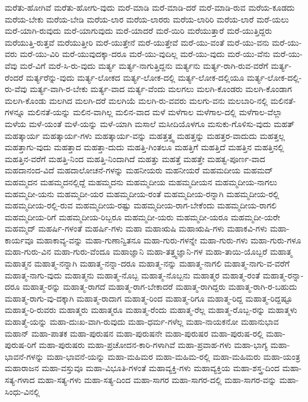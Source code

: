 {ಮರೆತು-ಹೋಗಿವೆ
ಮರೆತು-ಹೋಗು-ವುದು
ಮರೆ-ಮಾಡಿ
ಮರೆ-ಮಾಡಿ-ದರೆ
ಮರೆ-ಮಾಡಿ-ರುವ
ಮರೆಯ-ಕೂಡದು
ಮರೆಯ-ಬೇಕು
ಮರೆಯ-ಬೇಡಿ
ಮರೆಯ-ಲಾರ
ಮರೆಯ-ಲಾರರು
ಮರೆಯ-ಲಾರಿರಿ
ಮರೆಯ-ಲಾರೆ
ಮರೆ-ಯಲು
ಮರೆ-ಯಾಗಿ-ರುವುದು
ಮರೆ-ಯಾಗುವುದು
ಮರೆ-ಯಾದರೆ
ಮರೆ-ಯಿರಿ
ಮರೆಯುತ್ತಾರೆ
ಮರೆ-ಯುತ್ತಿದ್ದರು
ಮರೆಯುತ್ತಿ-ರುತ್ತವೆ
ಮರೆಯುತ್ತೀರಿ
ಮರೆ-ಯುತ್ತೇನೆ
ಮರೆ-ಯುತ್ತೇವೆ
ಮರೆ-ಯು-ವಂತೆ
ಮರೆ-ಯು-ವನು
ಮರೆ-ಯು-ವರು
ಮರೆ-ಯು-ವಿರಿ
ಮರೆ-ಯುವುದಕ್ಕಾ-ದರೂ
ಮರೆ-ಯು-ವುದಿಲ್ಲ
ಮರೆ-ಯು-ವುದು
ಮರೆ-ಯು-ವೆನು
ಮರೆ-ಯು-ವೆವು
ಮರೆ-ವಿಗೆ
ಮರೆ-ಸಿ-ರು-ವುದು
ಮರ್ತ್ಯ
ಮರ್ತ್ಯ-ನಾಗುತ್ತಿದ್ದನು
ಮರ್ತ್ಯನು
ಮರ್ತ್ಯ-ರಾಗಿ-ರುವ-ವರೆಗೆ
ಮರ್ತ್ಯ-ರೆಂದರೆ
ಮರ್ತ್ಯರೆನ್ನು-ವುದು
ಮರ್ತ್ಯ-ಲೋಕದ
ಮರ್ತ್ಯ-ಲೋಕ-ದಲ್ಲಿ
ಮರ್ತ್ಯ-ಲೋಕ-ದಲ್ಲಿಯೂ
ಮರ್ತ್ಯ-ಲೋಕ-ದಲ್ಲಿ-ರು-ವೆವು
ಮರ್ತ್ಯ-ವಾಗಿ-ರ-ಬೇಕು
ಮರ್ತ್ಯ-ವಾದ
ಮರ್ತ್ಯ-ವೆಂದು
ಮಲಗಲು
ಮಲಗಿ-ಕೊಂಡರು
ಮಲಗಿ-ಕೊಂಡಾಗ
ಮಲಗಿ-ಕೊಂಡು
ಮಲಗಿದ
ಮಲಗಿ-ದರೆ
ಮಲಗಿಯೆ
ಮಲಗಿ-ರು-ವವರು
ಮಲಗು-ವನು
ಮಲಬಾರಿ-ನಲ್ಲಿ
ಮಲಿನತೆ-ಗಳನ್ನೂ
ಮಲಿನತೆ-ಯನ್ನು
ಮಲಿನ-ವಾಗಿಲ್ಲ
ಮಲಿನ-ವಾದ
ಮಳೆ
ಮಳೆಗಾಲ
ಮಳೆಗಾಲ-ದಲ್ಲಿ
ಮಳೆಗಾಲ-ವೆಲ್ಲಾ
ಮಳೆಯ
ಮಳೆ-ಯಂತೆ
ಮಳೆ-ಯನ್ನು
ಮಳೆ-ಯಾಗಿ
ಮಸಾಲೆ
ಮಸೀದಿಯೊಳಗೂ
ಮಸುಕು-ಗೊಳಿಸು-ವುದು
ಮಹತ್
ಮಹತ್ಕಾರ್ಯ
ಮಹತ್ಕಾರ್ಯ-ಗಳು
ಮಹತ್ಕಾರ್ಯ-ವನ್ನು
ಮಹತ್ತತ್ತ್ವ
ಮಹತ್ತನ್ನು
ಮಹತ್ತರ-ವಾದುದು
ಮಹತ್ತಲ್ಲ
ಮಹತ್ತಾಗು-ವುದು
ಮಹತ್ತಾದ
ಮಹತ್ತಾ-ದುದು
ಮಹತ್ತಿ-ಗಿಂತಲೂ
ಮಹತ್ತಿಗೆ
ಮಹತ್ತಿದೆ
ಮಹತ್ತಿನ
ಮಹತ್ತಿನಲ್ಲಿ
ಮಹತ್ತಿನ-ವರೆಗೆ
ಮಹತ್ತಿ-ನಿಂದ
ಮಹತ್ತಿ-ನಿಂದಾಗಿದೆ
ಮಹತ್ತು
ಮಹತ್ತೆ
ಮಹತ್ತೇ
ಮಹತ್ವ-ಪೂರ್ಣ-ವಾದ
ಮಹದಾನಂದ-ವಿದೆ
ಮಹದಾಲೋಚನೆ-ಗಳನ್ನು
ಮಹನೀಯರು
ಮಹನೀಯರೆ
ಮಹಮದೀಯ
ಮಹಮದ್
ಮಹಮ್ಮದನ
ಮಹಮ್ಮದನಲ್ಲಿದ್ದೆ
ಮಹಮ್ಮದನು
ಮಹಮ್ಮದೀಯ
ಮಹಮ್ಮದೀಯನ
ಮಹಮ್ಮದೀಯ-ನಾಗಲು
ಮಹಮ್ಮದೀ-ಯನು
ಮಹಮ್ಮದೀ-ಯರ
ಮಹಮ್ಮದೀಯ-ರಂತೆ
ಮಹಮ್ಮದೀಯ-ರನ್ನಾಗಿ
ಮಹಮ್ಮದೀಯ-ರಲ್ಲಿ
ಮಹಮ್ಮದೀಯ-ರಲ್ಲಿ-ರುವ
ಮಹಮ್ಮದೀಯ-ರಷ್ಟು
ಮಹಮ್ಮದೀಯ-ರಾಗ-ಬೇಕೆಂದು
ಮಹಮ್ಮದೀಯ-ರಾಗಲಿ
ಮಹಮ್ಮದೀಯ-ರಿಗೆ
ಮಹಮ್ಮದೀಯ-ರಿಬ್ಬರೂ
ಮಹಮ್ಮದೀ-ಯರು
ಮಹಮ್ಮದೀ-ಯರೂ
ಮಹಮ್ಮದೀ-ಯರೇ
ಮಹಮ್ಮದ್
ಮಹರ್ಷಿ-ಗಳಂತೆ
ಮಹರ್ಷಿ-ಗಳು
ಮಹಾ
ಮಹಾಋಷಿ
ಮಹಾಋಷಿ-ಗಳು
ಮಹಾಕವಿ-ಗಳು
ಮಹಾ-ಕಾರ್ಯವೂ
ಮಹಾಕಾವ್ಯ-ವನ್ನು
ಮಹಾ-ಗುಣಾನ್ವಿತನೂ
ಮಹಾ-ಗುರು-ಗಳನ್ನೇ
ಮಹಾ-ಗುರು-ಗಳು
ಮಹಾ-ಗುರು-ಗಳೂ
ಮಹಾ-ಗುರು-ವಿನ
ಮಹಾ-ಗುರು-ವೆಂದೂ
ಮಹಾಜ್ಞಾನಿ
ಮಹಾ-ತತ್ತ್ವಜ್ಞಾನಿ-ಗಳ
ಮಹಾ-ತಾಯಿ-ಯೊಬ್ಬರೆ
ಮಹಾತ್ಮ
ಮಹಾತ್ಮನ
ಮಹಾತ್ಮ-ನನ್ನಾಗಿ
ಮಹಾತ್ಮ-ನನ್ನಾ-ದರೂ
ಮಹಾತ್ಮ-ನನ್ನು
ಮಹಾತ್ಮ-ನಾಗಲಿ
ಮಹಾತ್ಮ-ನಾಗು-ವ-ವರೆಗೆ
ಮಹಾತ್ಮ-ನಾಗು-ವುದು
ಮಹಾತ್ಮನು
ಮಹಾತ್ಮ-ನೊಬ್ಬ
ಮಹಾತ್ಮ-ನೊಬ್ಬನು
ಮಹಾತ್ಮರ
ಮಹಾತ್ಮ-ರಂತೆ
ಮಹಾತ್ಮ-ರನ್ನಾ-ದರೂ
ಮಹಾತ್ಮ-ರನ್ನು
ಮಹಾತ್ಮ-ರಾಗದೆ
ಮಹಾತ್ಮ-ರಾಗ-ಬೇಕಾದರೆ
ಮಹಾತ್ಮ-ರಾಗಿದ್ದರು
ಮಹಾತ್ಮ-ರಾಗಿ-ರ-ಬಹುದು
ಮಹಾತ್ಮ-ರಾಗು-ವು-ದಕ್ಕಾಗಿ
ಮಹಾತ್ಮ-ರಾದಾಗ
ಮಹಾತ್ಮ-ರಿಂದ
ಮಹಾತ್ಮ-ರಿಗೂ
ಮಹಾತ್ಮ-ರಿದ್ದ
ಮಹಾತ್ಮ-ರಿದ್ದಷ್ಟೂ
ಮಹಾತ್ಮ-ರಿ-ರುವರು
ಮಹಾತ್ಮರು
ಮಹಾತ್ಮರೂ
ಮಹಾತ್ಮ-ರೆಂದು
ಮಹಾತ್ಮ-ರೆಲ್ಲ
ಮಹಾತ್ಮ-ರೊಬ್ಬ-ರನ್ನು
ಮಹಾತ್ಮಳು
ಮಹಾತ್ಮೆ-ಯನ್ನು
ಮಹಾ-ದುಃಖ-ವಾಗಿ-ರುವುದು
ಮಹಾ-ಧರ್ಮ-ಗಳೆಲ್ಲ
ಮಹಾ-ನಾಯಕನೋ
ಮಹಾನುಭಾವ
ಮಹಾನ್
ಮಹಾ-ಪಾತಕ
ಮಹಾ-ಪುರುಷನ
ಮಹಾ-ಪುರುಷನೇ
ಮಹಾ-ಪುರುಷರ
ಮಹಾ-ಪುರುಷ-ರಲ್ಲಿ
ಮಹಾ-ಪುರುಷ-ರಿಗೆ
ಮಹಾ-ಪುರುಷರು
ಮಹಾ-ಪ್ರಚೋದನ-ಕಾರಿ-ಗಳಾಗಿವೆ
ಮಹಾ-ಪ್ರವಾಹ-ಗಳು
ಮಹಾ-ಭಾಗ್ಯ
ಮಹಾ-ಭಾವನೆ-ಗಳನ್ನು
ಮಹಾ-ಭಾವನೆ-ಯನ್ನು
ಮಹಾ-ಮಹಿಮರ
ಮಹಾ-ಮಹಿಮ-ರಲ್ಲಿ
ಮಹಾ-ಮಹಿಮರು
ಮಹಾ-ಯಂತ್ರ
ಮಹಾರಾಜನ
ಮಹಾ-ವಸ್ತುವೂ
ಮಹಾ-ವಿಭೂತಿ-ಗಳಂತೆ
ಮಹಾವ್ಯಕ್ತಿ-ಗಳು
ಮಹಾವ್ಯಕ್ತಿಯ
ಮಹಾ-ಶಸ್ತ್ರ-ದಿಂದ
ಮಹಾ-ಸತ್ಯ-ಗಳಾದ
ಮಹಾ-ಸತ್ಯ-ಗಳು
ಮಹಾ-ಸತ್ಯ-ದಿಂದ
ಮಹಾ-ಸಾಗರ
ಮಹಾ-ಸಾಗರ-ದಲ್ಲಿ
ಮಹಾ-ಸಾಗರ-ವನ್ನು
ಮಹಾ-ಸಿಂಧು-ವಿನಲ್ಲಿ
}
